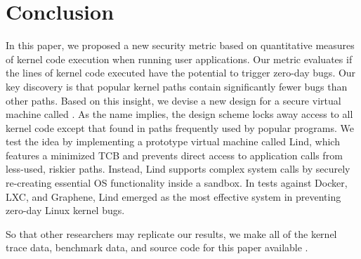 \section{Conclusion}
\label{sec.conclusion}

In this paper, we proposed a new security metric based on quantitative measures
of kernel code execution when running user applications.
Our metric evaluates if the lines of kernel code executed have the potential to
trigger zero-day bugs.
Our key discovery is that popular kernel paths contain significantly fewer bugs
than other paths.
Based on this insight, we devise a new design for a secure virtual machine called \lip.
As the name implies, the design scheme locks away access to all
kernel code except that found in paths frequently used by
popular programs. We test the \lip idea by implementing a prototype virtual machine
called Lind, which features a minimized TCB and prevents direct access to application
calls from less-used, riskier paths.
Instead, Lind supports complex system calls by securely re-creating
essential OS functionality inside a sandbox.
In tests against Docker, LXC, and Graphene, Lind emerged as the most effective
system in preventing zero-day Linux kernel bugs.

So that other researchers may replicate our results, we make all of the kernel
trace data, benchmark data, and source code for this paper available \cite{Lind}.
